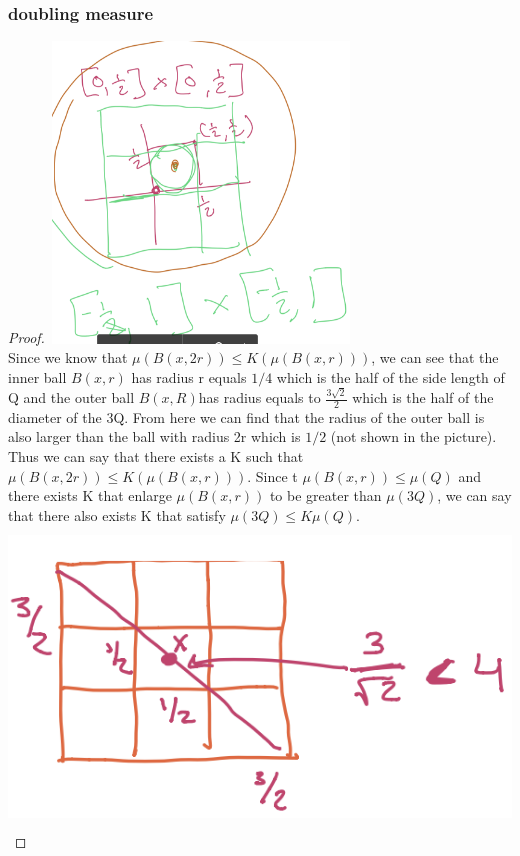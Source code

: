 \documentclass{article}
\begin{document}
\begin{itemize}
\subsubsection{doubling measure}
\begin{proof}
\includegraphics[width=8cm, height=8cm]{doubling measure.png}\\
Since we know that $\mu(B(x,2r))\leq K(\mu(B(x,r)))$, we can see that the inner ball $B(x,r)$ has radius r equals $1/4$ which is the half of the side length of Q and the outer ball $B(x,R)$has radius equals to $\frac{3\sqrt{2}}{2}$ which is the half of the diameter of the 3Q. From here we can find that the radius of the outer ball is also larger than the ball with radius 2r which is $1/2$ (not shown in the picture). Thus we can say that there exists a K such that $\mu(B(x,2r))\leq K(\mu(B(x,r)))$. Since t $\mu(B(x,r)) \le \mu(Q)$ and there exists K that enlarge $\mu(B(x,r))$ to be greater than $\mu(3Q)$, we can say that there also exists K that satisfy $\mu(3Q) \leq K\mu(Q)$.\\
\includegraphics[width=15cm, height=8cm]{dm2.png}\\

\end{proof}
\end{itemize}
\end{document}
